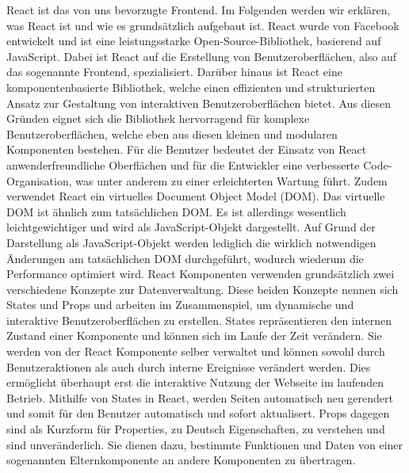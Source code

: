 React ist das von uns bevorzugte Frontend. Im Folgenden werden wir erklären, was React ist und wie es grundsätzlich aufgebaut ist.
React wurde von Facebook entwickelt und ist eine leistungsstarke Open-Source-Bibliothek, basierend auf JavaScript. Dabei ist React auf die Erstellung von Benutzeroberflächen, also auf das sogenannte Frontend, spezialisiert. Darüber hinaus ist React eine komponentenbasierte Bibliothek, welche einen effizienten und strukturierten Ansatz zur Gestaltung von interaktiven Benutzeroberflächen bietet. 
Aus diesen Gründen eignet sich die Bibliothek hervorragend für komplexe Benutzeroberflächen, welche eben aus diesen kleinen und modularen Komponenten bestehen. Für die Benutzer bedeutet der Einsatz von React anwenderfreundliche Oberflächen und für die Entwickler eine verbesserte Code-Organisation, was unter anderem zu einer erleichterten Wartung führt.
Zudem verwendet React ein virtuelles Document Object Model (DOM). Das virtuelle DOM ist ähnlich zum tatsächlichen DOM. Es ist allerdings wesentlich leichtgewichtiger und wird als JavaScript-Objekt dargestellt. Auf Grund der Darstellung als JavaScript-Objekt werden lediglich die wirklich notwendigen Änderungen am tatsächlichen DOM durchgeführt, wodurch wiederum die Performance optimiert wird.
React Komponenten verwenden grundsätzlich zwei verschiedene Konzepte zur Datenverwaltung. Diese beiden Konzepte nennen sich States und Props und arbeiten im Zusammenspiel, um dynamische und interaktive Benutzeroberflächen zu erstellen.
States repräsentieren den internen Zustand einer Komponente und können sich im Laufe der Zeit verändern. Sie werden von der React Komponente selber verwaltet und können sowohl durch Benutzeraktionen als auch durch interne Ereignisse verändert werden.
Dies ermöglicht überhaupt erst die interaktive Nutzung der Webseite im laufenden Betrieb. Mithilfe von States in React, werden Seiten automatisch neu gerendert und somit für den Benutzer automatisch und sofort aktualisert.
Props dagegen sind als Kurzform für Properties, zu Deutsch Eigenschaften, zu verstehen und sind unveränderlich. Sie dienen dazu, bestimmte Funktionen und Daten von einer sogenannten Elternkomponente an andere Komponenten zu übertragen.